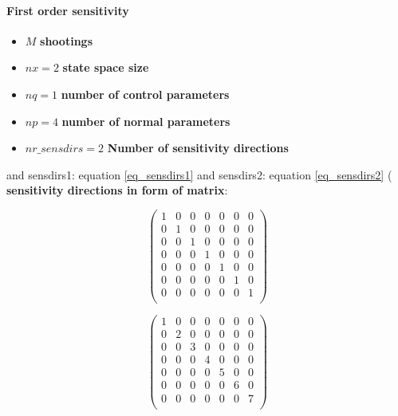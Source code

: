 \documentclass[12pt, letterpaper]{article}
\begin{document}
\paragraph{First order sensitivity}


\begin{itemize}
	\item $M$ \textbf{shootings}
	\item $nx=2$ \textbf{state space size}
	\item $nq=1$ \textbf{number of control parameters}
	\item $np=4$ \textbf{number of normal parameters}
	\item $nr\_sensdirs=2$ \textbf{Number of sensitivity directions}
\end{itemize}

and sensdirs1: equation \ref{eq_sensdirs1} and sensdirs2: equation \ref{eq_sensdirs2} ( \textbf{sensitivity directions in form of matrix}:

\begin{equation}
\label{eq_sensdirs1}
\begin{pmatrix}
1 & 0 & 0 & 0 & 0 & 0 & 0\\
0 & 1 & 0 & 0 & 0 & 0 & 0\\
0 & 0 & 1 & 0 & 0 & 0 & 0\\
0 & 0 & 0 & 1 & 0 & 0 & 0\\
0 & 0 & 0 & 0 & 1 & 0 & 0\\
0 & 0 & 0 & 0 & 0 & 1 & 0\\
0 & 0 & 0 & 0 & 0 & 0 & 1\\
\end{pmatrix}
\end{equation}

\begin{equation}
\label{eq_sensdirs2}
\begin{pmatrix}
1 & 0 & 0 & 0 & 0 & 0 & 0\\
0 & 2 & 0 & 0 & 0 & 0 & 0\\
0 & 0 & 3 & 0 & 0 & 0 & 0\\
0 & 0 & 0 & 4 & 0 & 0 & 0\\
0 & 0 & 0 & 0 & 5 & 0 & 0\\
0 & 0 & 0 & 0 & 0 & 6 & 0\\
0 & 0 & 0 & 0 & 0 & 0 & 7\\
\end{pmatrix}
\end{equation}

\fi
\end{document}
